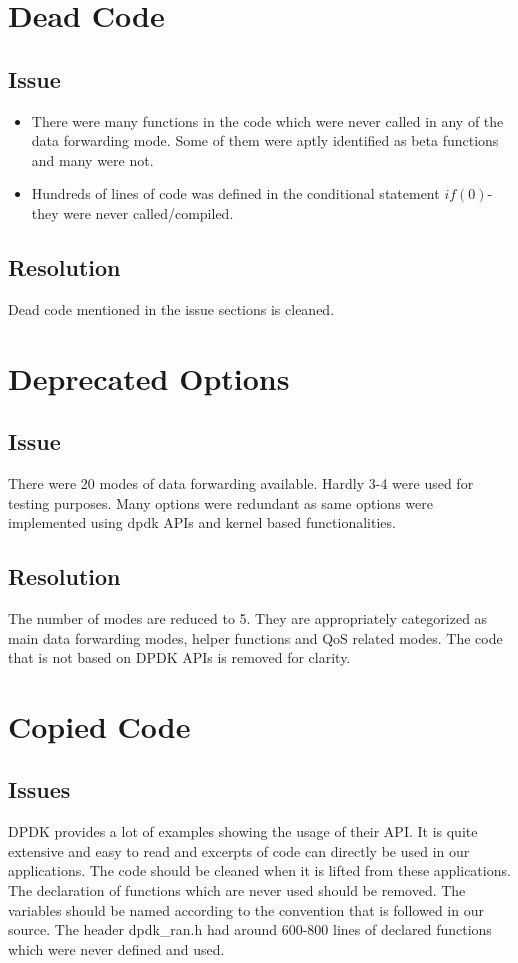 \section{Dead Code}
\subsection{Issue}
\begin{itemize}
	\item There were many functions in the code which were never called in any of the data forwarding mode.
	      Some of them were aptly identified as beta functions and many were not.
	\item Hundreds of lines of code was defined in the  conditional statement $if(0)$- they were never called/compiled.
\end{itemize}
\subsection{Resolution}
Dead code mentioned in the issue sections is cleaned.

\section{Deprecated Options}
\subsection{Issue}
There were 20 modes of data forwarding available. Hardly 3-4 were used for testing purposes. Many options 
were redundant as same options were implemented using dpdk APIs and kernel based functionalities.
\subsection{Resolution}
The number of modes are reduced to 5. They are appropriately categorized as main data forwarding modes, helper 
functions and QoS related modes. The code that is not based on DPDK APIs is removed for clarity.
\section{Copied Code}
\subsection{Issues}
DPDK provides a lot of examples showing the usage of their API. It is quite extensive and easy to read and excerpts of 
code can directly be used in our applications. The code should be cleaned when it is lifted from these applications.
The declaration of functions which are never used should be removed. The variables should be named according to
the convention that is followed in our source. The header dpdk\_ran.h had around 600-800 lines of declared functions
which were never defined and used.
